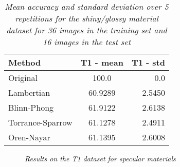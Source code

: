 \begin{table}
	\center
	\begin{tabular}{l|c|r}
	Method 				&	T1 - mean 	& T1 - std \\
	\hline
	Original			&	100.0		& 0.0 \\
	Lambertian 			&	60.9289		& 2.5450 \\
	Blinn-Phong 		& 	61.9122 	& 2.6138 \\
	Torrance-Sparrow 	&	61.1278 	& 2.4911 \\
	Oren-Nayar 			&	61.1395 	& 2.6008 \\
	\end{tabular}
	\caption{{\it Mean accuracy and standard deviation over 5 repetitions for the shiny/glossy material dataset for 36 images in the training set and 16 images in the test set}}
	\label{tab:SpecularResultsB}
\end{table}
\begin{figure}[H]
	\begin{center}
	\end{center}
	\caption{{\it Results on the T1 dataset for specular materials}}
	\label{fig:SpecularPlotB}
\end{figure}

